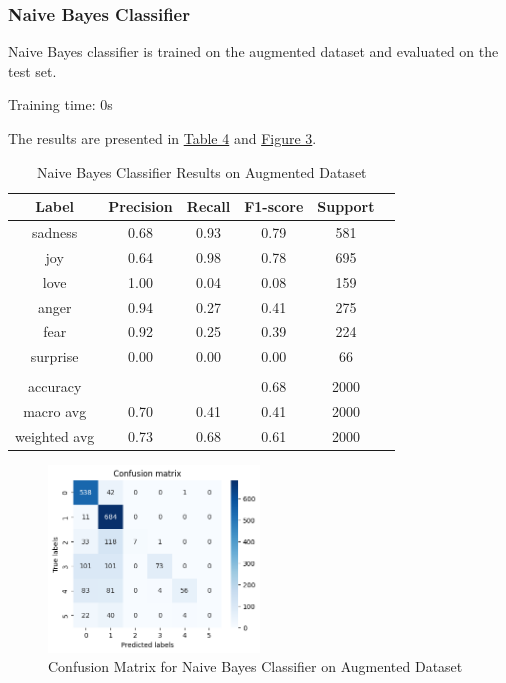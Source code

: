 \documentclass{article}
\begin{document}
\subsubsection{Naive Bayes Classifier}
Naive Bayes classifier is trained on the augmented dataset and evaluated on the test set.

Training time: 0s

The results are presented in \hyperref[table:nb_results_3]{Table 4} and \hyperref[fig:nb_confusion_matrix_3]{Figure 3}.

\begin{table}[h]
    \label{table:nb_results_3}
\centering
\begin{tabular}{|c|c|c|c|c|c|}
\hline
\textbf{Label} & \textbf{Precision} & \textbf{Recall} & \textbf{F1-score} & \textbf{Support} \\ \hline
sadness            & 0.68               & 0.93            & 0.79              & 581              \\ \hline
joy        & 0.64               & 0.98            & 0.78              & 695              \\ \hline
love          & 1.00               & 0.04            & 0.08              & 159              \\ \hline
anger           & 0.94               & 0.27            & 0.41              & 275              \\ \hline
fear           & 0.92               & 0.25            & 0.39              & 224              \\ \hline
surprise       & 0.00               & 0.00            & 0.00              & 66               \\ \hline
&  &  &  &  \\ \hline
accuracy       &                     &                 & 0.68              & 2000             \\ \hline
macro avg      & 0.70               & 0.41            & 0.41              & 2000             \\ \hline
weighted avg   & 0.73               & 0.68            & 0.61              & 2000             \\ \hline
\end{tabular}
\bigskip
\caption{Naive Bayes Classifier Results on Augmented Dataset}
\end{table}

\begin{figure}[h]
    \label{fig:nb_confusion_matrix_3}
    \centering
    \includegraphics[width=0.5\textwidth]{confusion_matrix_3_nb.png}
    \caption{Confusion Matrix for Naive Bayes Classifier on Augmented Dataset}
\end{figure}
\end{document}
